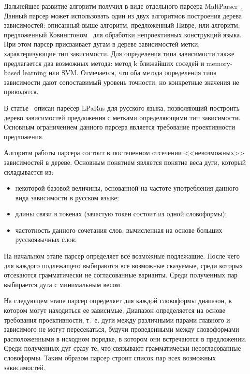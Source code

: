 Дальнейшее развитие алгоритм получил в виде отдельного парсера MaltParser~\cite{nivre2007maltparser}. Данный парсер может использовать один из двух алгоритмов построения дерева зависимостей: описанный выше алгоритм, предложенный Нивре, или алгоритм, предложенный Ковингтоном~\cite{covington2001fundamental} для обработки непроективных конструкций языка. При этом парсер присваивает дугам в дереве зависимостей метки, характеризующие тип зависимости. Для определения типа зависимости также предлагается два возможных метода: метод k ближайших соседей и memory-based learning или SVM. Отмечается, что оба метода определения типа зависимости дают сопоставимый уровень точности, но конкретные значения не приводятся.

В статье~\cite{kiselev2017sintaksicheskij} описан паресер LPaRus для русского языка, позволяющий построить дерево зависимостей предложения с метками определяющими тип зависимости. Основным ограничением данного парсера является требование проективности предложения.

Алгоритм работы парсера состоит в постепенном отсечении <<невозможных>> зависимостей в дереве. Основным понятием является понятие веса дуги, который складывается из:
\begin{itemize}
	\item некоторой базовой величины, основанной на частоте употребления данного вида зависимости в русском языке;
	\item длины связи в токенах (зачастую токен состоит из одной словоформы);
	\item частотность данного сочетания слов, вычисленная на основе больших русскоязычных слов.
\end{itemize}

На начальном этапе парсер определяет все возможные подлежащие. После чего для каждого подлежащего выбираются все возможные сказуемые, среди которых отсекаются грамматически не согласованные варианты. Среди полученных пар выбирается дуга с минимальным весом.

На следующем этапе парсер определяет для каждой словоформы диапазон, в котором могут находиться ее зависимые. Диапазон определяется на основе требования проективности, т.~е. дуги между различными парами главного и зависимого не могут пересекаться, будучи проведенными между словоформами расположенными в исходном порядке, в котором они встречаются в предложении. Среди полученных дуг сразу те, что связывают грамматически несогласованные словоформы. Таким образом парсер строит список пар всех возможных зависимостей.

